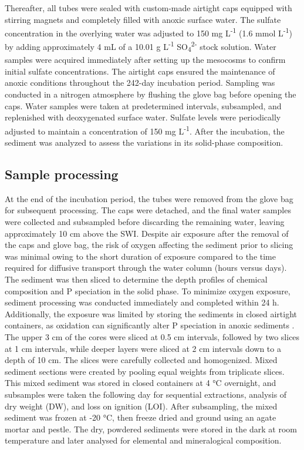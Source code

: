 \documentclass[12pt,twoside]{book}
\begin{document}
Thereafter, all tubes were sealed with custom-made airtight caps equipped with stirring magnets and completely filled with anoxic surface water. The sulfate concentration in the overlying water was adjusted to 150 mg L\textsuperscript{-1} (1.6 mmol L\textsuperscript{-1}) by adding approximately 4 mL of a 10.01 g L\textsuperscript{-1} SO\textsubscript{4}\textsuperscript{2-} stock solution. Water samples were acquired immediately after setting up the mesocosms to confirm initial sulfate concentrations. The airtight caps ensured the maintenance of anoxic conditions throughout the 242-day incubation period. Sampling was conducted in a nitrogen atmosphere by flushing the glove bag before opening the caps. Water samples were taken at predetermined intervals, subsampled, and replenished with deoxygenated surface water. Sulfate levels were periodically adjusted to maintain a concentration of 150 mg L\textsuperscript{-1}. After the incubation, the sediment was analyzed to assess the variations in its solid-phase composition.

\subsection{Sample processing}\label{sample-processing}

At the end of the incubation period, the tubes were removed from the glove bag for subsequent processing. The caps were detached, and the final water samples were collected and subsampled before discarding the remaining water, leaving approximately 10 cm above the SWI. Despite air exposure after the removal of the caps and glove bag, the risk of oxygen affecting the sediment prior to slicing was minimal owing to the short duration of exposure compared to the time required for diffusive transport through the water column (hours versus days). The sediment was then sliced to determine the depth profiles of chemical composition and P speciation in the solid phase. To minimize oxygen exposure, sediment processing was conducted immediately and completed within 24 h. Additionally, the exposure was limited by storing the sediments in closed airtight containers, as oxidation can significantly alter P speciation in anoxic sediments \citep{Kraal2014}.
The upper 3 cm of the cores were sliced at 0.5 cm intervals, followed by two slices at 1 cm intervals, while deeper layers were sliced at 2 cm intervals down to a depth of 10 cm. The slices were carefully collected and homogenized. Mixed sediment sections were created by pooling equal weights from triplicate slices. This mixed sediment was stored in closed containers at 4 °C overnight, and subsamples were taken the following day for sequential extractions, analysis of dry weight (DW), and loss on ignition (LOI). After subsampling, the mixed sediment was frozen at -20 °C, then freeze dried and ground using an agate mortar and pestle. The dry, powdered sediments were stored in the dark at room temperature and later analysed for elemental and mineralogical composition.
\end{document}
